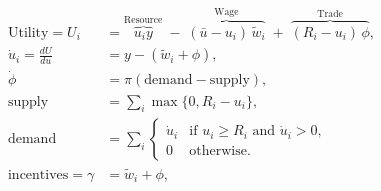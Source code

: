 \documentclass[10pt]{article}
\begin{document}
\begin{align*}\text{Utility} = U_i &= \overbrace{u_i y}^{\text{Resource}} \;-\; \overbrace{(\bar{u}-u_i)\,\tilde{w}_i}^{\text{Wage}} \;+\; \overbrace{(R_i - u_i)\,\phi}^{\text{Trade}}, \\[6pt] 
\dot{u}_i = \frac{dU}{du} &= y - (\tilde{w}_i + \phi), \\[6pt]
  \dot{\phi} &= \pi  \left( \text{demand} - \text{supply} \right),\\[6pt]
 \text{supply}  &= \sum_{i} \max\{0, R_i - u_i\}, \\[4pt]
 \text{demand}  &= \sum_{i} \begin{cases} \dot{u}_i & \text{if } u_i \ge R_i \text{ and } \dot{u}_i > 0, \\[4pt] 0 & \text{otherwise}. \end{cases} \\[4pt]
\text{incentives} = \gamma &= \tilde{w}_i + \phi, \\[6pt]




\end{align*}
\end{document}
